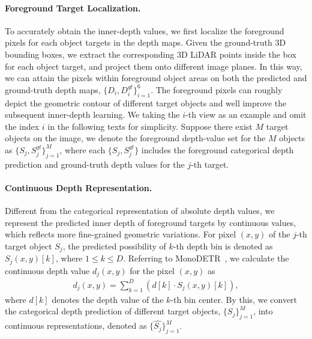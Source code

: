 \paragraph{Foreground Target Localization.}
To accurately obtain the inner-depth values, we first localize the foreground pixels for each object targets in the depth maps. Given the ground-truth 3D bounding boxes, we extract the corresponding 3D LiDAR points inside the box for each object target, and project them onto different image planes. In this way, we can attain the pixels within foreground object areas on both the predicted and ground-truth depth maps, $\{D_i, D_i^{gt}\}_{i=1}^6$. The foreground pixels can roughly depict the geometric contour of different target objects and well improve the subsequent inner-depth learning. We taking the $i$-th view as an example and omit the index $i$ in the following texts for simplicity. Suppose there exist $M$ target objects on the image, we denote the foreground depth-value set for the $M$ objects as $\{S_j, S_j^{gt}\}_{j=1}^M$, where each $\{S_j, S_j^{gt}\}$ includes the foreground categorical depth prediction and ground-truth depth values for the $j$-th target.

\paragraph{Continuous Depth Representation.}
Different from the categorical representation of absolute depth values, we represent the predicted inner depth of foreground targets by continuous values, which reflects more fine-grained geometric variations. For pixel $(x, y)$ of the $j$-th target object $S_j$, the predicted possibility of $k$-th depth bin is denoted as $S_j(x, y)[k]$, where $1\le k\le D$. Referring to MonoDETR~\cite{b47,b48}, we calculate the continuous depth value $d_j(x, y)$ for the pixel $(x, y)$ as
 \begin{equation}
 \label{eq:FM}
 \begin{aligned}
    d_j(x, y) = {\sum_{k=1}^D({d[k]\cdot S_j(x, y)[k]})},
 \end{aligned}
 \end{equation}
where $d[k]$ denotes the depth value of the $k$-th bin center. By this, we convert the categorical depth prediction of different target objects, $\{S_j\}_{j=1}^M$, into continuous representations, denoted as $\{\hat{S_j}\}_{j=1}^M$.

